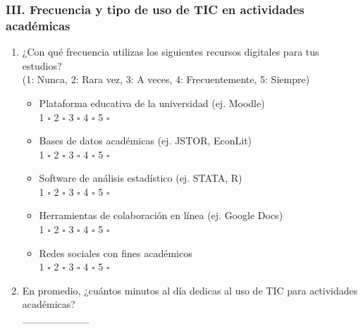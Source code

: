 \documentclass[12pt, a4paper]{article}
\begin{document}
\subsubsection*{III. Frecuencia y tipo de uso de TIC en actividades académicas}
\begin{enumerate}[resume, label=\arabic*.]
    \item ¿Con qué frecuencia utilizas los siguientes recursos digitales para tus estudios?\\
    (1: Nunca, 2: Rara vez, 3: A veces, 4: Frecuentemente, 5: Siempre)
    \begin{itemize}
        \item Plataforma educativa de la universidad (ej. Moodle)\\
        \hspace{1em} 1 $\square$ \hspace{1em} 2 $\square$ \hspace{1em} 3 $\square$ \hspace{1em} 4 $\square$ \hspace{1em} 5 $\square$
        \item Bases de datos académicas (ej. JSTOR, EconLit)\\
        \hspace{1em} 1 $\square$ \hspace{1em} 2 $\square$ \hspace{1em} 3 $\square$ \hspace{1em} 4 $\square$ \hspace{1em} 5 $\square$
        \item Software de análisis estadístico (ej. STATA, R)\\
        \hspace{1em} 1 $\square$ \hspace{1em} 2 $\square$ \hspace{1em} 3 $\square$ \hspace{1em} 4 $\square$ \hspace{1em} 5 $\square$
        \item Herramientas de colaboración en línea (ej. Google Docs)\\
        \hspace{1em} 1 $\square$ \hspace{1em} 2 $\square$ \hspace{1em} 3 $\square$ \hspace{1em} 4 $\square$ \hspace{1em} 5 $\square$
        \item Redes sociales con fines académicos\\
        \hspace{1em} 1 $\square$ \hspace{1em} 2 $\square$ \hspace{1em} 3 $\square$ \hspace{1em} 4 $\square$ \hspace{1em} 5 $\square$
    \end{itemize}
    \item En promedio, ¿cuántos minutos al día dedicas al uso de TIC para actividades académicas?\\
    \_\_\_\_\_\_\_\_\_
\end{enumerate}
\end{document}
